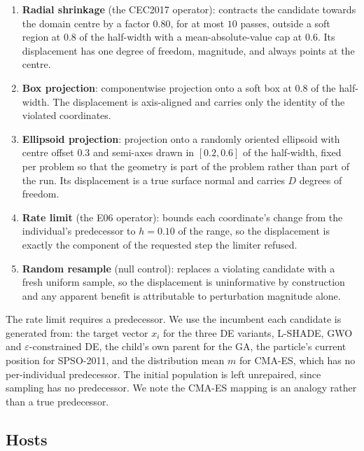 \begin{enumerate}
  \item \textbf{Radial shrinkage} (the CEC2017 operator): contracts the candidate
        towards the domain centre by a factor $0.80$, for at most $10$ passes,
        outside a soft region at $0.8$ of the half-width with a mean-absolute-value
        cap at $0.6$. Its displacement has one degree of freedom, magnitude, and
        always points at the centre.
  \item \textbf{Box projection}: componentwise projection onto a soft box at $0.8$
        of the half-width. The displacement is axis-aligned and carries only the
        identity of the violated coordinates.
  \item \textbf{Ellipsoid projection}: projection onto a randomly oriented
        ellipsoid with centre offset $0.3$ and semi-axes drawn in $[0.2,0.6]$ of
        the half-width, fixed per problem so that the geometry is part of the
        problem rather than part of the run. Its displacement is a true surface
        normal and carries $D$ degrees of freedom.
  \item \textbf{Rate limit} (the E06 operator): bounds each coordinate's change
        from the individual's predecessor to $h = 0.10$ of the range, so the
        displacement is exactly the component of the requested step the limiter
        refused.
  \item \textbf{Random resample} (null control): replaces a violating candidate
        with a fresh uniform sample, so the displacement is uninformative by
        construction and any apparent benefit is attributable to perturbation
        magnitude alone.
\end{enumerate}

The rate limit requires a predecessor. We use the incumbent each candidate is
generated from: the target vector $x_i$ for the three DE variants, L-SHADE, GWO
and $\varepsilon$-constrained DE, the child's own parent for the GA, the particle's
current position for SPSO-2011, and the distribution mean $m$ for CMA-ES, which
has no per-individual predecessor. The initial population is left unrepaired,
since sampling has no predecessor. We note the CMA-ES mapping is an analogy
rather than a true predecessor.

\subsection{Hosts}

